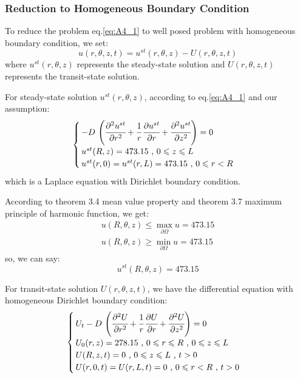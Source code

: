 \documentclass[../main.tex]{subfiles}
\begin{document}
\subsubsection{Reduction to Homogeneous Boundary Condition}

To reduce the problem eq.\ref{eq:A4_1} to well posed problem with homogeneous boundary condition, we set:
\begin{equation} \label{eq:A4_3}
    u(r, \theta, z, t) = u^{st}(r, \theta, z) - U(r, \theta, z, t)
\end{equation}
where $u^{st}(r, \theta, z)$ represents the steady-state solution and $U(r, \theta, z, t)$ represents the transit-state solution.

For steady-state solution $u^{st}(r, \theta, z)$, according to eq.\ref{eq:A4_1} and our assumption:
\begin{align}
    \begin{cases} \label{eq:A4_4}
        \, - D \, \left(\cfrac{\partial^2 u^{st}}{\partial r^2} + \cfrac{1}{r} \, \cfrac{\partial u^{st}}{\partial  r} + \cfrac{\partial^2 u^{st}}{\partial z^2} \right) = 0 \\
        \, u^{st}(R, z) = 473.15 \text{ ,  } 0 \leqslant z \leqslant L \\
        \, u^{st}(r, 0) = u^{st}(r, L) = 473.15 \text{ ,  } 0 \leqslant r < R
    \end{cases}
\end{align}
which is a Laplace equation with Dirichlet boundary condition.

According to theorem 3.4 mean value property and theorem 3.7 maximum principle of harmonic function, we get:
\begin{align}
    u(R, \theta, z) \leqslant \max_{\partial \Omega}{u} = 473.15 \nonumber \\
    u(R, \theta, z) \geqslant \min_{\partial \Omega}{u} = 473.15 \nonumber
\end{align}
so, we can say:
\begin{equation} \label{eq:A4_5}
    u^{st}(R, \theta, z) = 473.15
\end{equation}

For transit-state solution $U(r, \theta, z, t)$, we have the differential equation with homogeneous Dirichlet boundary condition:
\begin{align}
    \begin{cases} \label{eq:A4_6}
        \, U_t - D \, \left(\cfrac{\partial^2 U}{\partial r^2} + \cfrac{1}{r} \, \cfrac{\partial U}{\partial  r} + \cfrac{\partial^2 U}{\partial z^2} \right) = 0 \\
        \, U_0(r, z) = 278.15 \text{ ,  } 0 \leqslant r \leqslant R \text{ ,  } 0 \leqslant z \leqslant L \\
        \, U(R, z, t) = 0 \text{ ,  } 0 \leqslant z \leqslant L \text{ ,  } t > 0 \\
        \, U(r, 0, t) = U(r, L, t) = 0 \text{ ,  } 0 \leqslant r < R \text{ ,  } t > 0
    \end{cases}
\end{align}
\end{document}
